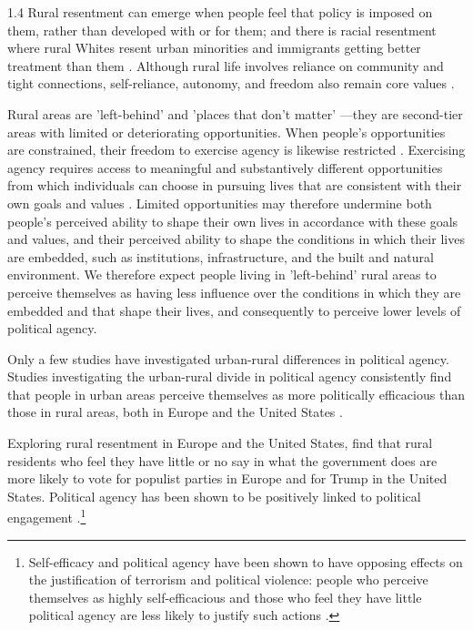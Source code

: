 \documentclass[10pt, letterpaper]{article}
\begin{document}
\begin{spacing}{1.4}
 Rural resentment can emerge when people feel that policy is imposed on them, rather than developed with or for them; and there is racial resentment where rural Whites resent urban minorities and immigrants getting better treatment than them \citep{diamond23}. %
 Although rural life involves reliance on community and tight connections, self-reliance, autonomy, and freedom also remain core values \citep{diamond23}.

Rural areas are 'left-behind' \citep{ulrich2021people} and 'places that don't matter' \citep{rodriguez2018revenge}%
---they are second-tier areas with limited or deteriorating opportunities. 
When people's opportunities are constrained, their freedom to exercise agency is likewise restricted \citep{ryan2004autonomy,welzel13}. Exercising agency
requires access to meaningful and substantively different opportunities from which individuals can choose in pursuing lives that are consistent with their own
goals and values \citep{sen1993markets,sen1999commodities,sen2005human}. Limited opportunities may therefore undermine both people's perceived ability to shape their own lives in accordance with these goals and values, and their perceived ability to shape the conditions in which their lives are embedded, such as institutions, infrastructure, and the built and natural environment.
We therefore expect people living in 'left-behind' rural areas to perceive themselves as having less influence over the conditions in which they are embedded and that shape their lives, and consequently to perceive lower levels
of political agency. %
 
Only a few studies have investigated urban-rural differences in political agency. 
 Studies investigating the urban-rural divide in political agency consistently find that people in urban areas perceive themselves as more politically efficacious than those in rural areas, both in Europe \citep{garcia2024they,luukkonen2022urbanisation} and the United States \citep{rowland2024political}.


Exploring rural resentment in Europe and the United States,
\citet{margalit2025cultural} find that rural residents who feel they have little or no say in what  the government does are more likely to vote for populist parties in Europe and for Trump in the United States.
%
Political agency has been shown to be positively linked to political engagement \citep{accetta23}.\footnote{Self-efficacy and political agency have been shown to have opposing effects on the justification of terrorism and political violence: people who perceive themselves as highly self-efficacious and those who feel they have little political agency are less likely to justify such actions \citep{julkif2022self}.}


\end{spacing}
\end{document}
